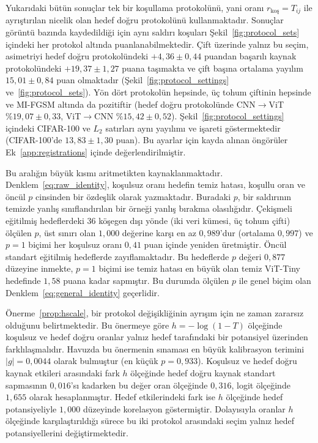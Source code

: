 Yukarıdaki bütün sonuçlar tek bir koşullama protokolünü, yani oranı $r_{\text{koş}} = T_{ij}$ ile ayrıştırılan nicelik olan hedef doğru protokolünü kullanmaktadır. Sonuçlar görüntü bazında kaydedildiği için aynı saldırı koşuları Şekil~\ref{fig:protocol_sets} içindeki her protokol altında puanlanabilmektedir. Çift üzerinde yalnız bu seçim, asimetriyi hedef doğru protokolündeki $+4{,}36\pm0{,}44$ puandan başarılı kaynak protokolündeki $+19{,}37\pm1{,}27$ puana taşımakta ve çift başına ortalama yayılım $15{,}01\pm0{,}84$ puan olmaktadır (Şekil~\ref{fig:protocol_settings} ve~\ref{fig:protocol_sets}). Yön dört protokolün hepsinde, üç tohum çiftinin hepsinde ve MI-FGSM altında da pozitiftir (hedef doğru protokolünde CNN$\rightarrow$ViT $\%19{,}07\pm0{,}33$, ViT$\rightarrow$CNN $\%15{,}42\pm0{,}52$). Şekil~\ref{fig:protocol_settings} içindeki CIFAR-100 ve $L_2$ satırları aynı yayılımı ve işareti göstermektedir (CIFAR-100'de $13{,}83\pm1{,}30$ puan). Bu ayarlar için kayda alınan öngörüler Ek~\ref{app:registrations} içinde değerlendirilmiştir.

Bu aralığın büyük kısmı aritmetikten kaynaklanmaktadır. Denklem~\eqref{eq:raw_identity}, koşulsuz oranı hedefin temiz hatası, koşullu oran ve öncül $p$ cinsinden bir özdeşlik olarak yazmaktadır. Buradaki $p$, bir saldırının temizde yanlış sınıflandırılan bir örneği yanlış bırakma olasılığıdır. Çekişmeli eğitilmiş hedeflerdeki $36$ köşegen dışı yönde (iki veri kümesi, üç tohum çifti) ölçülen $p$, üst sınırı olan $1{,}000$ değerine karşı en az $0{,}989$'dur (ortalama $0{,}997$) ve $p = 1$ biçimi her koşulsuz oranı $0{,}41$ puan içinde yeniden üretmiştir. Öncül standart eğitilmiş hedeflerde zayıflamaktadır. Bu hedeflerde $p$ değeri $0{,}877$ düzeyine inmekte, $p = 1$ biçimi ise temiz hatası en büyük olan temiz ViT-Tiny hedefinde $1{,}58$ puana kadar sapmıştır. Bu durumda ölçülen $p$ ile genel biçim olan Denklem~\eqref{eq:general_identity} geçerlidir.

Önerme~\ref{prop:hscale}, bir protokol değişikliğinin ayrışım için ne zaman zararsız olduğunu belirtmektedir. Bu önermeye göre $h = -\log(1 - T)$ ölçeğinde koşulsuz ve hedef doğru oranlar yalnız hedef tarafındaki bir potansiyel üzerinden farklılaşmalıdır. Havuzda bu önermenin sınaması en büyük kalibrasyon terimini $|g| = 0{,}0044$ olarak bulmuştur (en küçük $p = 0{,}933$). Koşulsuz ve hedef doğru kaynak etkileri arasındaki fark $h$ ölçeğinde hedef doğru kaynak standart sapmasının $0{,}016$'sı kadarken bu değer oran ölçeğinde $0{,}316$, logit ölçeğinde $1{,}655$ olarak hesaplanmıştır. Hedef etkilerindeki fark ise $h$ ölçeğinde hedef potansiyeliyle $1{,}000$ düzeyinde korelasyon göstermiştir. Dolayısıyla oranlar $h$ ölçeğinde karşılaştırıldığı sürece bu iki protokol arasındaki seçim yalnız hedef potansiyellerini değiştirmektedir.


